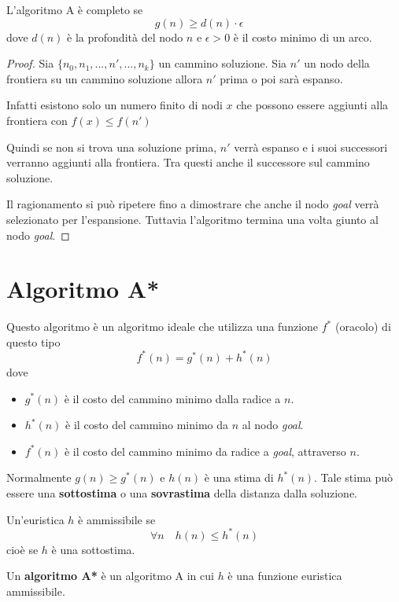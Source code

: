 \begin{theorem}
	L'algoritmo A \`e completo se
	\[ g(n) \geq d(n) \cdot \epsilon \quad \]
	dove $d(n)$ \`e la profondit\`a del nodo $n$ e $\epsilon > 0$ \`e il costo minimo di
	un arco.
	\begin{proof}
		Sia $\{ n_0, n_1, ..., n', ..., n_k \}$ un cammino soluzione. Sia $n'$ un nodo
		della frontiera su un cammino soluzione allora $n'$ prima o poi sar\`a espanso.

		Infatti esistono solo un numero finito di nodi $x$ che possono essere aggiunti
		alla frontiera con $f(x) \leq f(n')$

		Quindi se non si trova una soluzione prima, $n'$ verr\`a espanso e i suoi
		successori verranno aggiunti alla frontiera. Tra questi anche il successore sul
		cammino soluzione.

		Il ragionamento si pu\`o ripetere fino a dimostrare che anche il nodo \emph{goal}
		verr\`a selezionato per l'espansione. Tuttavia l'algoritmo termina una volta
		giunto al nodo \emph{goal}.
	\end{proof}
\end{theorem}

\section{Algoritmo A*}
Questo algoritmo \`e un algoritmo ideale che utilizza una funzione $f^*$ (oracolo) di questo
tipo \[ f^*(n) = g^*(n) + h^*(n) \] dove
\begin{itemize}
	\item $g^*(n)$ \`e il costo del cammino minimo dalla radice a $n$.
	\item $h^*(n)$ \`e il costo del cammino minimo da $n$ al nodo \emph{goal}.
	\item $f^*(n)$ \`e il costo del cammino minimo da radice a \emph{goal}, attraverso $n$.
\end{itemize}
Normalmente $g(n) \geq g^*(n)$ e $h(n)$ \`e una stima di $h^*(n)$. Tale stima pu\`o essere
una \textbf{sottostima} o una \textbf{sovrastima} della distanza dalla soluzione.

\begin{definition}
	Un'euristica $h$ \`e ammissibile se
	\[ \forall n \quad h(n) \leq h^*(n) \]
	cio\`e se $h$ \`e una sottostima.
\end{definition}

\begin{definition}
	Un \textbf{algoritmo A*} \`e un algoritmo A in cui $h$ \`e una funzione euristica
	ammissibile.
\end{definition}

